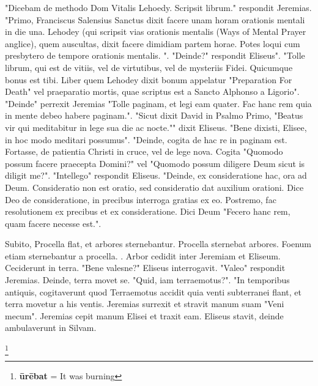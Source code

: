 "Dicebam de methodo Dom Vitalis Lehoedy. Scripsit librum." respondit Jeremias. "Primo, Franciscus Salensius Sanctus dixit facere unam horam orationis mentali in die una. Lehodey (qui scripsit vias orationis mentalis (Ways of Mental Prayer anglice), quem auscultas, dixit facere dimidiam partem horae. Potes loqui cum presbytero de tempore orationis mentalis. ". "Deinde?" respondit Eliseus". "Tolle librum, qui est de vitiis, vel de virtutibus, vel de mysteriis Fidei. Quicumque bonus est tibi. Liber quem Lehodey dixit bonum appelatur "Preparation For Death" vel praeparatio mortis, quae scriptus est a Sancto Alphonso a Ligorio". "Deinde" perrexit Jeremias "Tolle paginam, et legi eam quater. Fac hanc rem quia in mente debeo habere paginam.". "Sicut dixit David in Psalmo Primo, "Beatus vir qui meditabitur in lege sua die ac nocte."" dixit Eliseus. "Bene dixisti, Elisee, in hoc modo meditari possumus". "Deinde, cogita de hac re in paginam est. Fortasse, de patientia Christi in cruce, vel de lege nova. Cogita "Quomodo possum facere praecepta Domini?" vel "Quomodo possum diligere Deum sicut is diligit me?". "Intellego" respondit Eliseus. "Deinde, ex consideratione hac, ora ad Deum. Consideratio non est oratio, sed consideratio dat auxilium orationi. Dice Deo de consideratione, in precibus interroga gratias ex eo. Postremo, fac resolutionem ex precibus et ex consideratione. Dici Deum "Fecero hanc rem, quam facere necesse est.". 

Subito, Procella flat, et arbores sternebantur. Procella sternebat arbores. Foenum etiam sternebantur a procella. . Arbor cedidit inter Jeremiam et Eliseum. Ceciderunt in terra. "Bene valesne?" Eliseus interrogavit. "Valeo" respondit Jeremias.  Deinde, terra movet se. "Quid, iam terraemotus?". "In temporibus antiquis, cogitaverunt quod Terraemotus accidit quia venti subterranei flant, et terra movetur a his ventis. Jeremias surrexit et stravit manum suam "Veni mecum". Jeremias cepit manum Elisei et traxit eam. Eliseus stavit, deinde ambulaverunt in Silvam.

   

\footnote{\textbf{ūrēbat} = It was burning}